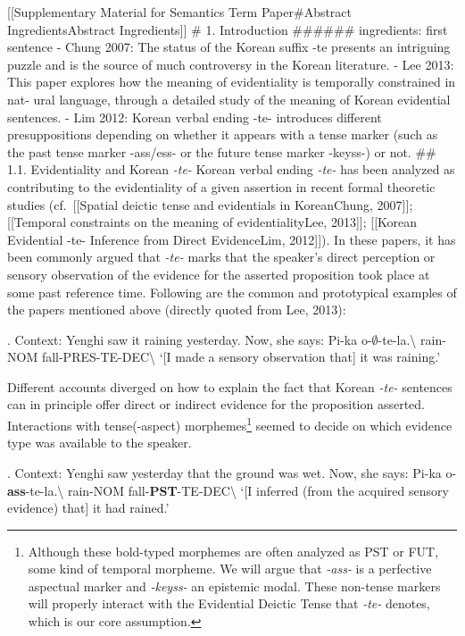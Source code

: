 {[}{[}Supplementary Material for Semantics Term Paper\#Abstract
Ingredients\textbar Abstract Ingredients{]}{]} \# 1. Introduction
\#\#\#\#\#\# ingredients: first sentence - Chung 2007: The status of the
Korean suffix -te presents an intriguing puzzle and is the source of
much controversy in the Korean literature. - Lee 2013: This paper
explores how the meaning of evidentiality is temporally constrained in
nat- ural language, through a detailed study of the meaning of Korean
evidential sentences. - Lim 2012: Korean verbal ending -te- introduces
different presuppositions depending on whether it appears with a tense
marker (such as the past tense marker -ass/ess- or the future tense
marker -keyss-) or not. \#\# 1.1. Evidentiality and Korean \emph{-te-}
Korean verbal ending \emph{-te-} has been analyzed as contributing to
the evidentiality of a given assertion in recent formal theoretic
studies (cf.~{[}{[}Spatial deictic tense and evidentials in
Korean\textbar Chung, 2007{]}{]}; {[}{[}Temporal constraints on the
meaning of evidentiality\textbar Lee, 2013{]}{]}; {[}{[}Korean
Evidential -te- Inference from Direct Evidence\textbar Lim, 2012{]}{]}).
In these papers, it has been commonly argued that \emph{-te-} marks that
the speaker's direct perception or sensory observation of the evidence
for the asserted proposition took place at some past reference time.
Following are the common and prototypical examples of the papers
mentioned above (directly quoted from Lee, 2013):

\ex. Context: Yenghi saw it raining yesterday. Now, she says: \gll Pi-ka
o-\(\emptyset\)-te-la.\textbackslash{} rain-NOM
fall-PRES-TE-DEC\textbackslash{} `{[}I made a sensory observation
that{]} it was raining.'

Different accounts diverged on how to explain the fact that Korean
\emph{-te-} sentences can in principle offer direct or indirect evidence
for the proposition asserted. Interactions with tense(-aspect)
morphemes\footnote{Although these bold-typed morphemes are often
  analyzed as PST or FUT, some kind of temporal morpheme. We will argue
  that \emph{-ass-} is a perfective aspectual marker and \emph{-keyss-}
  an epistemic modal. These non-tense markers will properly interact
  with the Evidential Deictic Tense that \emph{-te-} denotes, which is
  our core assumption.} seemed to decide on which evidence type was
available to the speaker.

\ex. Context: Yenghi saw yesterday that the ground was wet. Now, she
says: \gll Pi-ka o-\textbf{ass}-te-la.\textbackslash{} rain-NOM
fall-\textbf{PST}-TE-DEC\textbackslash{} `{[}I inferred (from the
acquired sensory evidence) that{]} it had rained.'

